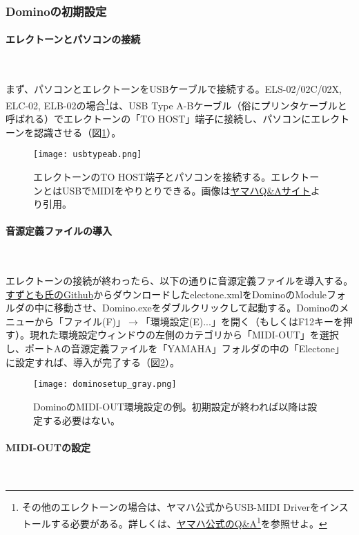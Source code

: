 \documentclass[uplatex, 10pt, dvipdfmx]{jsarticle}
\numberwithin{equation}{section}
\begin{document}
\subsubsection{Dominoの初期設定}
\paragraph{エレクトーンとパソコンの接続}\

まず、パソコンとエレクトーンをUSBケーブルで接続する。ELS-02/02C/02X, ELC-02, ELB-02の場合\footnote{その他のエレクトーンの場合は、ヤマハ公式からUSB-MIDI Driverをインストールする必要がある。詳しくは、\href{https://yamaha.custhelp.com/app/answers/detail/a_id/10045/}{ヤマハ公式のQ\&A}\footnote{\url{https://yamaha.custhelp.com/app/answers/detail/a_id/10045/}}を参照せよ。}は、USB Type A-Bケーブル（俗にプリンタケーブルと呼ばれる）でエレクトーンの「TO HOST」端子に接続し、パソコンにエレクトーンを認識させる（図\ref{figELUSB}）。

\begin{figure}[h]
  \centering
  \texttt{[image: usbtypeab.png]}
  \caption{エレクトーンのTO HOST端子とパソコンを接続する。エレクトーンとはUSBでMIDIをやりとりできる。画像は\href{https://yamaha.custhelp.com/app/answers/detail/a_id/1316/related/1}{ヤマハQ\&Aサイト}より引用。}
  \label{figELUSB}
\end{figure}

\paragraph{音源定義ファイルの導入}\

エレクトーンの接続が終わったら、以下の通りに音源定義ファイルを導入する。\href{https://github.com/kamekyame/el-domino_define}{すずとも氏のGithub}からダウンロードしたelectone.xmlをDominoのModuleフォルダの中に移動させ、Domino.exeをダブルクリックして起動する。Dominoのメニューから「ファイル(F)」$\rightarrow$「環境設定(E)...」を開く（もしくはF12キーを押す）。現れた環境設定ウィンドウの左側のカテゴリから「MIDI-OUT」を選択し、ポートAの音源定義ファイルを「YAMAHA」フォルダの中の「Electone」に設定すれば、導入が完了する（図\ref{figDominoSetup}）。

\begin{figure}[h]
  \centering
  \texttt{[image: dominosetup\_gray.png]}
  \caption{DominoのMIDI-OUT環境設定の例。初期設定が終われば以降は設定する必要はない。}
  \label{figDominoSetup}
\end{figure}

\paragraph{MIDI-OUTの設定}\
\end{document}
